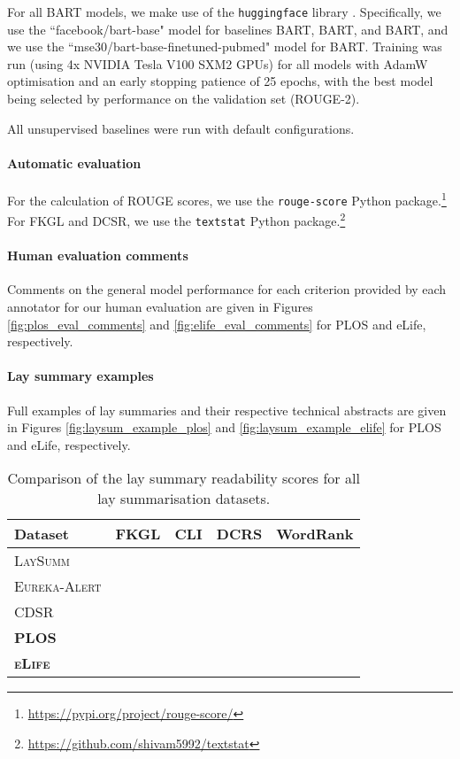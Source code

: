 \documentclass[11pt]{article}
\begin{document}
For all \textsc{BART} models, we make use of the \texttt{huggingface} library \citep{huggingface}. Specifically, we use the ``facebook/bart-base" model for baselines \textsc{BART}, \textsc{BART}, and \textsc{BART}, and we use the ``mse30/bart-base-finetuned-pubmed" model for \textsc{BART}. Training was run (using 4x NVIDIA Tesla V100 SXM2 GPUs) for all models with AdamW optimisation \citep{Loshchilov2019DecoupledWD} and an early stopping patience of 25 epochs, with the best model being selected by performance on the validation set (ROUGE-2). 


All unsupervised baselines were run with default configurations.

\paragraph{Automatic evaluation}
For the calculation of ROUGE scores, we use the \texttt{rouge-score} Python package.\footnote{\url{https://pypi.org/project/rouge-score/}} For FKGL and DCSR, we use the \texttt{textstat} Python package.\footnote{\url{https://github.com/shivam5992/textstat}} 

\paragraph{Human evaluation comments}
Comments on the general model performance for each criterion provided by each annotator for our human evaluation are given in Figures \ref{fig:plos_eval_comments} and  \ref{fig:elife_eval_comments} for PLOS and eLife, respectively. 

\paragraph{Lay summary examples}
Full examples of lay summaries and their respective technical abstracts are given in Figures \ref{fig:laysum_example_plos} and \ref{fig:laysum_example_elife} for PLOS and eLife, respectively.

\begin{table*}[]
    \centering
    \begin{tabular}{lcccc}
        \hline
        \textbf{Dataset} & \textbf{FKGL} & \textbf{CLI} & \textbf{DCRS} & \textbf{WordRank}  \\
        \hline
        \textsc{LaySumm}        &  &  &  &  \\
        \textsc{Eureka-Alert}   &  &  &  &   \\
        \textsc{CDSR}           &  &  &  &  \\
        \textbf{\textsc{PLOS}}  &  &  &  &  \\
        \textbf{\textsc{eLife}} &  &  &  &  \\
        \hline
    \end{tabular}
    \caption{Comparison of the lay summary readability scores for all lay summarisation datasets.}
    \label{tab:dataset_readability}
\end{table*}
\end{document}
